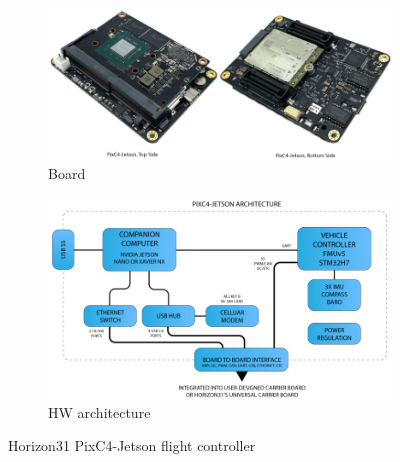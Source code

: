\begin{figure}[htb!]
  \centering
  \begin{subfigure}[t]{0.9\textwidth}
  \includegraphics[width=1.0\textwidth]{./img/png/hw-horizon-pixc4-jetson.png} 
  \caption{Board}%
  \label{fig:hw-horizonJetson-board}
  \end{subfigure}
%
  \begin{subfigure}[t]{0.9\textwidth}
  \includegraphics[width=1.0\textwidth]{./img/png/hw-horizon-pixc4-jetson-arch.png} 
  \caption{HW architecture}%
  \label{fig:hw-horizonJetson-arch}
\end{subfigure}
%
  \caption[Horizon31 PixC4-Jetson flight controller]{Horizon31 PixC4-Jetson flight controller~\cite{arduPilot-horizonJetson}\footnotemark}%
  \label{fig:hw-horizonJetson}
\end{figure}
%
%


